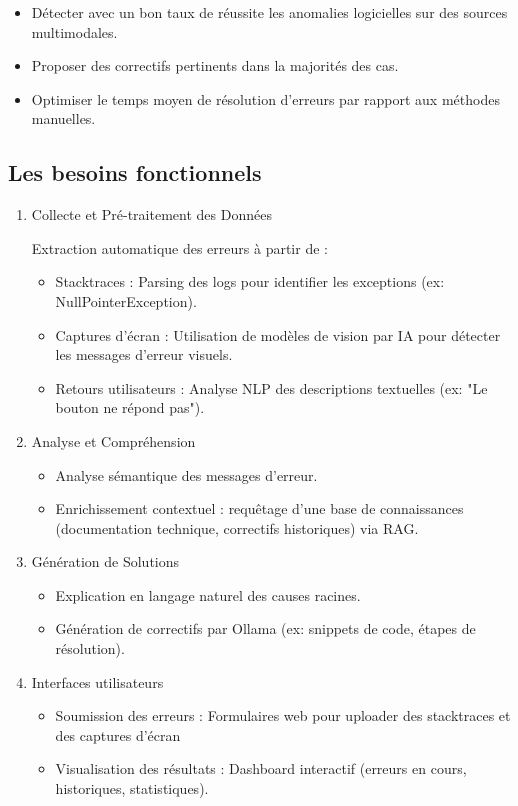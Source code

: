 \documentclass[12pt,a4paper]{report}
\begin{document}
	\begin{itemize}
		\item Détecter avec un bon taux de réussite les anomalies logicielles sur des sources multimodales.
		
		\item Proposer des correctifs pertinents dans la majorités des cas.
		
		\item Optimiser le temps moyen de résolution d’erreurs par rapport aux méthodes manuelles.
	\end{itemize}
	
	\subsection{Les besoins fonctionnels}
	
	\begin{enumerate}
		
		\item Collecte et Pré-traitement des Données
		
		Extraction automatique des erreurs à partir de :
		\begin{itemize}
			\item Stacktraces : Parsing des logs pour identifier les exceptions (ex: NullPointerException).			
			\item Captures d’écran : Utilisation de modèles de vision par IA pour détecter les messages d’erreur visuels.
			\item Retours utilisateurs : Analyse NLP des descriptions textuelles (ex: "Le bouton ne répond pas").
		\end{itemize}
		
		\item Analyse et Compréhension
		\begin{itemize}
			\item Analyse sémantique des messages d’erreur.
			\item Enrichissement contextuel : requêtage d’une base de connaissances (documentation technique, correctifs historiques) via RAG.
		\end{itemize}
		
		\item Génération de Solutions
		\begin{itemize}
			\item Explication en langage naturel des causes racines.
			\item Génération de correctifs par Ollama (ex: snippets de code, étapes de résolution).
		\end{itemize}
		
		\item Interfaces utilisateurs
		\begin{itemize}
			\item Soumission des erreurs : Formulaires web pour uploader des stacktraces et des captures d'écran
			\item Visualisation des résultats : Dashboard interactif (erreurs en cours, historiques, statistiques).
		\end{itemize}
		
	\end{enumerate}
	
\end{document}
